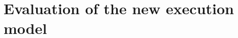 \documentclass[../main]{subfiles}
\begin{document}
%
%
%

\section{Evaluation of the new execution model}\label{sec:evaluation-of-the-new-execution-model}
\end{document}

